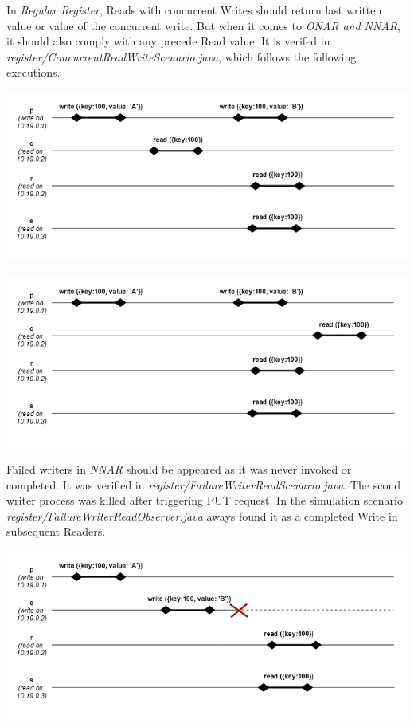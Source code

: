 \documentclass[a4paper, 11pt]{article}
\begin{document}
In \textit{Regular Register}, Reads with concurrent Writes should return last written value or value of the concurrent write. But when it comes to \textit{ONAR and NNAR}, it should also comply with any precede Read value. It is verifed in \textit{register/ConcurrentReadWriteScenario.java}, which follows the following executions.

{\centering\includegraphics[scale = 0.5]{./images/concurent_read_write.png}\par}

{\centering\includegraphics[scale = 0.5]{./images/concurent_read_write2.png}\par}


Failed writers in \textit{NNAR} should be appeared as it was never invoked or completed. It was verified in \textit{register/FailureWriterReadScenario.java}. The scond writer process was killed after triggering PUT request. In the simulation scenario \textit{register/FailureWriterReadObserver.java} aways found it as a completed Write in subsequent Readers.


{\centering\includegraphics[scale = 0.5]{./images/failed_writer.png}\par}
\end{document}
